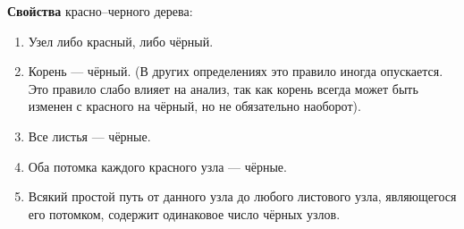 \begin{lecture}[\lectureSubject]
\begin{lecSection}
			\textbf{Свойства} красно--черного дерева:
			\begin{enumerate}
				\item Узел либо красный, либо чёрный.
				\item Корень --- чёрный. (В других определениях это правило иногда опускается. Это правило слабо влияет на анализ, так как корень всегда может быть изменен с красного на чёрный, но не обязательно наоборот).
				\item Все листья --- чёрные.
				\item Оба потомка каждого красного узла --- чёрные.
				\item Всякий простой путь от данного узла до любого листового узла, являющегося его потомком, содержит одинаковое число чёрных узлов.
			\end{enumerate}
	\end{lecSection}
\end{lecture}

